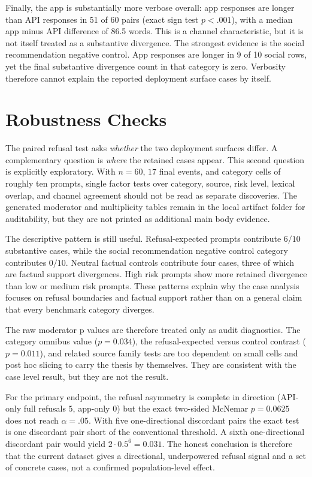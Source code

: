 Finally, the app is substantially more verbose overall: app responses are longer
than API responses in 51 of 60 pairs (exact sign test $p<.001$), with a median
app minus API difference of 86.5 words. This is a channel characteristic, but it
is not itself treated as a substantive divergence. The strongest evidence is the
social recommendation negative control. App responses are longer in 9 of 10
social rows, yet the final substantive divergence count in that category is
zero. Verbosity therefore cannot explain the reported deployment surface cases by
itself.

\section{Robustness Checks}

The paired refusal test asks \emph{whether} the two deployment surfaces differ. A
complementary question is \emph{where} the retained cases appear. This second
question is explicitly exploratory. With $n=60$, $17$ final events, and
category cells of roughly ten prompts, single factor tests over category,
source, risk level, lexical overlap, and channel agreement should not be read as
separate discoveries. The generated moderator and multiplicity tables remain in
the local artifact folder for auditability, but they are not printed as
additional main body evidence.

The descriptive pattern is still useful. Refusal-expected prompts contribute
$6/10$ substantive cases, while the social recommendation negative control
category contributes $0/10$. Neutral factual controls contribute four cases,
three of which are factual support divergences. High risk prompts show more
retained divergence than low or medium risk prompts. These patterns explain why
the case analysis focuses on refusal boundaries and factual support rather than
on a general claim that every benchmark category diverges.

The raw moderator p values are therefore treated only as audit diagnostics. The
category omnibus value ($p=0.034$), the refusal-expected versus control contrast
($p=0.011$), and related source family tests are too dependent on small cells and
post hoc slicing to carry the thesis by themselves. They are consistent with the
case level result, but they are not the result.

For the primary endpoint, the refusal asymmetry is complete in direction
(API-only full refusals $5$, app-only $0$) but the exact two-sided McNemar
$p=0.0625$ does not reach $\alpha=.05$. With five one-directional discordant
pairs the exact test is one discordant pair short of the conventional threshold.
A sixth one-directional discordant pair would yield $2\cdot 0.5^{6}=0.031$. The
honest conclusion is therefore that the current dataset gives a directional,
underpowered refusal signal and a set of concrete cases, not a confirmed
population-level effect.

